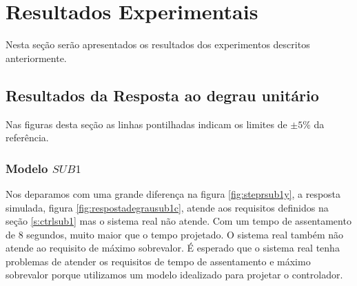 \section{Resultados Experimentais}
Nesta seção serão apresentados os resultados dos experimentos descritos anteriormente.
\subsection{Resultados da Resposta ao degrau unitário}\label{rstep}

Nas figuras desta seção as linhas pontilhadas indicam os limites de $\pm 5\%$ da referência.

\subsubsection{Modelo $SUB1$}
Nos deparamos com uma grande diferença na figura \ref{fig:steprsub1y}, a resposta simulada, figura \ref{fig:respostadegrausub1c}, atende aos requisitos definidos na seção \ref{s:ctrlsub1} mas o sistema real não atende. Com um tempo de assentamento de 8 segundos, muito maior que o tempo projetado. O sistema real também não atende ao requisito de máximo sobrevalor. É esperado que o sistema real tenha problemas de atender os requisitos de tempo de assentamento e máximo sobrevalor porque utilizamos um modelo idealizado para projetar o controlador.

